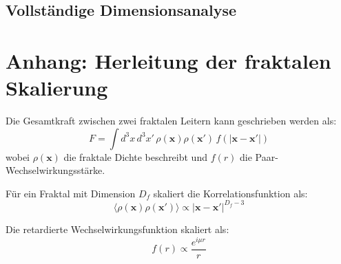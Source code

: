 	\subsection{Vollständige Dimensionsanalyse}
	\begin{table}[h]
		\centering
		\caption{Konsistente Dimensionsdefinitionen im T0-Modell}
		\label{tab:dimensions}
	\end{table}
	
	\section*{Anhang: Herleitung der fraktalen Skalierung}
	Die Gesamtkraft zwischen zwei fraktalen Leitern kann geschrieben werden als:
	\begin{equation}
		F = \int d^3x \, d^3x' \, \rho(\mathbf{x}) \rho(\mathbf{x}') \, f(|\mathbf{x}-\mathbf{x}'|)
	\end{equation}
	wobei $\rho(\mathbf{x})$ die fraktale Dichte beschreibt und $f(r)$ die Paar-Wechselwirkungsstärke.
	
	Für ein Fraktal mit Dimension $D_f$ skaliert die Korrelationsfunktion als:
	\begin{equation}
		\langle \rho(\mathbf{x}) \rho(\mathbf{x}')\rangle \propto |\mathbf{x}-\mathbf{x}'|^{D_f - 3}
	\end{equation}
	
	Die retardierte Wechselwirkungsfunktion skaliert als:
	\begin{equation}
		f(r) \propto \frac{e^{i\mu r}}{r}
	\end{equation}
	
